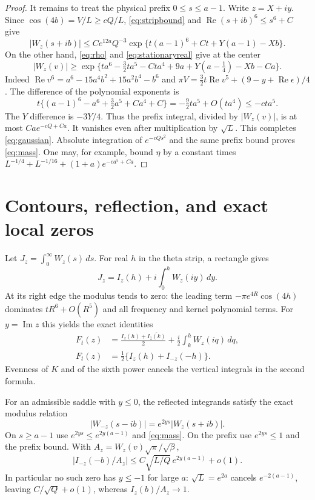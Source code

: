 \documentclass[11pt]{article}
\begin{document}
\begin{proof}
It remains to treat the physical prefix $0\leq s\leq a-1$.
Write $z=X+iy$. Since $\cos(4b)=V/L\geq cQ/L$,
\eqref{eq:stripbound} and
$\operatorname{Re}(s+ib)^6\leq s^6+C$ give
\begin{equation}\label{eq:prefixupper}
 |W_z(s+ib)|\leq C e^{12a}Q^{-3}
  \exp\{t(a-1)^6+Ct+Y(a-1)-Xb\}.
\end{equation}
On the other hand, \eqref{eq:rho} and \eqref{eq:stationaryreal}
give at the center
\begin{equation}\label{eq:centerlower}
 |W_z(v)|\geq
 \exp\{ta^6-\tfrac32ta^5-Cta^4+9a+Y(a-\tfrac14)-Xb-Ca\}.
\end{equation}
Indeed $\operatorname{Re}v^6=a^6-15a^4b^2+15a^2b^4-b^6$
and $\pi V=\tfrac32t\operatorname{Re}v^5+(9-y+\operatorname{Re}\epsilon)/4$.
The difference of the polynomial exponents is
\[
 t\{(a-1)^6-a^6+\tfrac32a^5+Ca^4+C\}
 =-\tfrac92ta^5+O(ta^4)\leq-cta^5.
\]
The $Y$ difference is $-3Y/4$. Thus the prefix integral,
divided by $|W_z(v)|$, is at most $Ca e^{-cQ+Ca}$.
It vanishes even after multiplication by $\sqrt L$.
This completes \eqref{eq:gaussian}. Absolute integration
of $e^{-cQs^2}$ and the same prefix bound proves
\eqref{eq:mass}. One may, for example, bound $\eta$ by a
constant times $L^{-1/4}+L^{-1/16}+(1+a)e^{-ca^5+Ca}$.
\end{proof}

\section{Contours, reflection, and exact local zeros}
Let $J_z=\int_0^\infty W_z(s)\,ds$. For real $h$ in the
theta strip, a rectangle gives
\[
 J_z=I_z(h)+i\int_0^hW_z(iy)\,dy.
\]
At its right edge the modulus tends to zero: the leading
term $-\pi e^{4R}\cos(4h)$ dominates $tR^6+O(R^5)$
and all frequency and kernel polynomial terms.
For $y=\operatorname{Im}z$ this yields the exact identities
\begin{align}
 F_t(z)&=\frac{I_z(h)+\overline{I_{\bar z}(k)}}2
          +\frac i2\int_k^h W_z(iq)\,dq,\label{eq:pair}\\
 F_t(z)&=\tfrac12\{I_z(h)+I_{-z}(-h)\}.\label{eq:mirror}
\end{align}
Evenness of $K$ and of the sixth power cancels the vertical
integrals in the second formula.

For an admissible saddle with $y\leq0$, the reflected
integrands satisfy the exact modulus relation
\[
 |W_{-z}(s-ib)|=e^{2ys}|W_z(s+ib)|.
\]
On $s\geq a-1$ use $e^{2ys}\leq e^{2y(a-1)}$ and
\eqref{eq:mass}. On the prefix use $e^{2ys}\leq1$ and
the prefix bound. With $A_z=W_z(v)\sqrt\pi/\sqrt\beta$,
\begin{equation}\label{eq:reflected}
 \left|I_{-z}(-b)/A_z\right|
 \leq C\sqrt{L/Q}\,e^{2y(a-1)}+o(1).
\end{equation}
In particular no such zero has $y\leq-1$ for large $a$:
$\sqrt L=e^{2a}$ cancels $e^{-2(a-1)}$, leaving
$C/\sqrt Q+o(1)$, whereas $I_z(b)/A_z\to1$.
\end{document}
